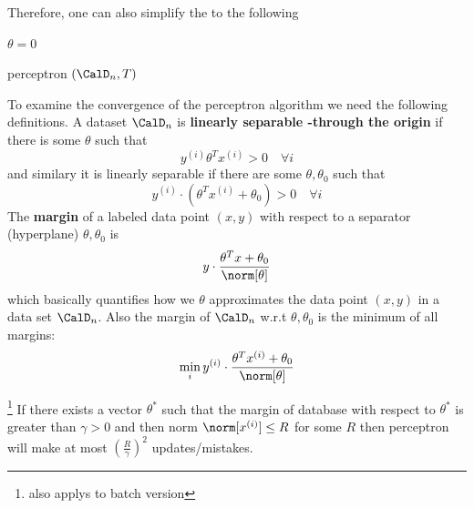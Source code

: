 Therefore, one can also simplify the  to the following

\begin{algorithm}[H]
    \DontPrintSemicolon
    $\theta = 0 $\;

    \Return{$\theta $}
    \caption{ perceptron $(\CalD_n , T )$}
\end{algorithm}

To examine the convergence of the perceptron algorithm we need the following definitions. A dataset \(\CalD_n\) is \textbf{linearly separable -through the origin} if there is some \(\theta\) such that
\begin{equation*}
    y^{(i)} \theta^T x^{(i)} > 0 \quad \forall i
\end{equation*}
and similary it is linearly separable if there are some \(\theta , \theta_0\) such that 
\begin{equation*}
    y^{(i)} \cdot \left( \theta^T x^{(i)}  + \theta_0 \right) > 0 \quad \forall i
\end{equation*}
The \textbf{margin} of a labeled data point \((x,y)\) with respect to a separator (hyperplane) \(\theta, \theta_0\) is
\begin{equation*}
    y \cdot \dfrac{\theta^T x +  \theta_0}{\norm[\theta]}
\end{equation*}
which basically quantifies how we \(\theta\) approximates the data point \((x,y)\) in a data set \(\CalD_n\). Also the margin of \(\CalD_n\) w.r.t \(\theta, \theta_0\) is
the minimum of all margins:
\begin{equation*}
    \min_i     y^{(i)} \cdot \dfrac{\theta^T x^{(i)} + \theta_0}{\norm[\theta]}
\end{equation*}

\begin{theorem}  \footnote{also applys to batch version}
    If there exists a vector \(\theta^\ast\) such that the margin of database with respect to \(\theta^\ast\) is greater than \(\gamma > 0\) and then norm \(\norm[x^{(i)}] \leq R\) for some \(R\) then perceptron will make at most \(\left(\frac{R}{\gamma} \right)^2\) updates/mistakes.
\end{theorem}

